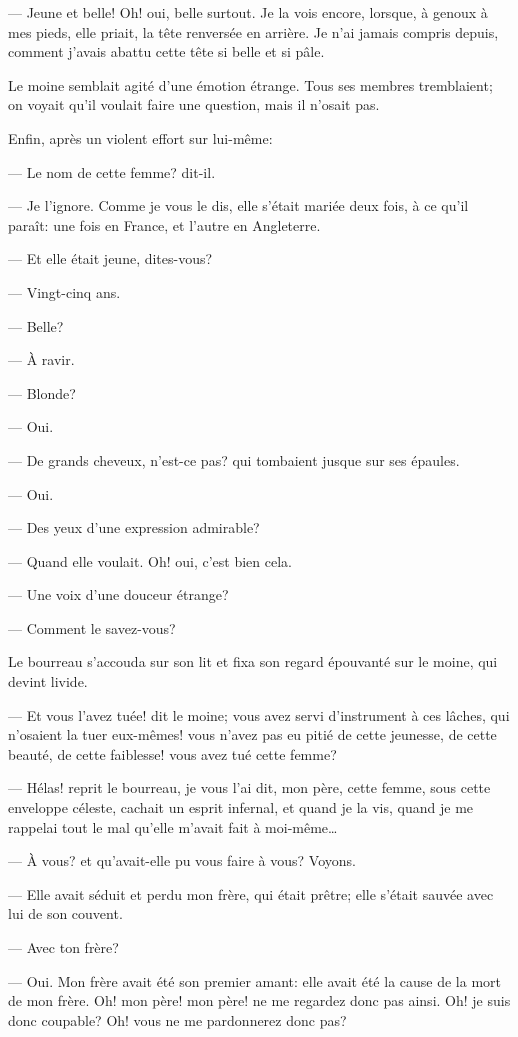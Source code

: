 — Jeune et belle! Oh! oui, belle surtout. Je la vois encore, lorsque, à genoux à mes pieds, elle priait, la tête renversée en arrière. Je n'ai jamais compris depuis, comment j'avais abattu cette tête si belle et si pâle.

Le moine semblait agité d'une émotion étrange. Tous ses membres tremblaient; on voyait qu'il voulait faire une question, mais il n'osait pas.

Enfin, après un violent effort sur lui-même:

— Le nom de cette femme? dit-il.

— Je l'ignore. Comme je vous le dis, elle s'était mariée deux fois, à ce qu'il paraît: une fois en France, et l'autre en Angleterre.

— Et elle était jeune, dites-vous?

— Vingt-cinq ans.

— Belle?

— À ravir.

— Blonde?

— Oui.

— De grands cheveux, n'est-ce pas? qui tombaient jusque sur ses épaules.

— Oui.

— Des yeux d'une expression admirable?

— Quand elle voulait. Oh! oui, c'est bien cela.

— Une voix d'une douceur étrange?

— Comment le savez-vous?

Le bourreau s'accouda sur son lit et fixa son regard épouvanté sur le moine, qui devint livide.

— Et vous l'avez tuée! dit le moine; vous avez servi d'instrument à ces lâches, qui n'osaient la tuer eux-mêmes! vous n'avez pas eu pitié de cette jeunesse, de cette beauté, de cette faiblesse! vous avez tué cette femme?

— Hélas! reprit le bourreau, je vous l'ai dit, mon père, cette femme, sous cette enveloppe céleste, cachait un esprit infernal, et quand je la vis, quand je me rappelai tout le mal qu'elle m'avait fait à moi-même\dots

— À vous? et qu'avait-elle pu vous faire à vous? Voyons.

— Elle avait séduit et perdu mon frère, qui était prêtre; elle s'était sauvée avec lui de son couvent.

— Avec ton frère?

— Oui. Mon frère avait été son premier amant: elle avait été la cause de la mort de mon frère. Oh! mon père! mon père! ne me regardez donc pas ainsi. Oh! je suis donc coupable? Oh! vous ne me pardonnerez donc pas?

